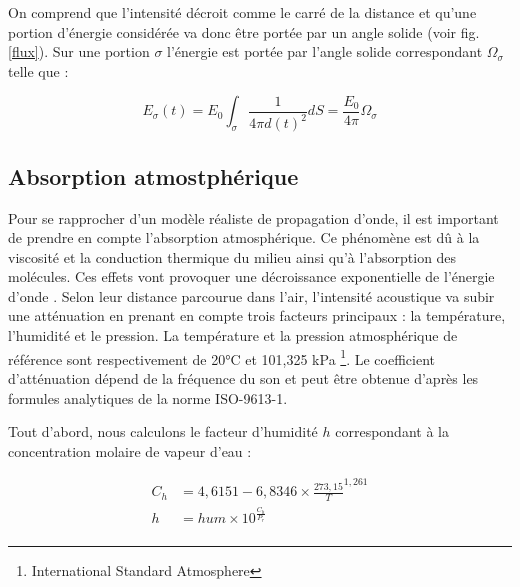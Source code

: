 On comprend que l'intensité décroit comme le carré de la distance et qu'une portion d'énergie considérée va donc être portée par un angle solide (voir fig. \ref{flux}). Sur une portion $\sigma$ l'énergie est portée par l'angle solide correspondant $\Omega_{\sigma}$ telle que :

\begin{equation} \label{eq_energie}
E_{\sigma}(t) = E_0 \int_{\sigma}  \frac{1}{4\pi  d(t)^2} dS = \frac{E_0}{4\pi}  \Omega_{\sigma}
\end{equation}





\subsection{Absorption atmostphérique}
 \label{sect_absAIr}
Pour se rapprocher d'un modèle réaliste de propagation d'onde, il est important de prendre en compte l'absorption atmosphérique. Ce phénomène est dû à la viscosité et la conduction thermique du milieu ainsi qu'à l'absorption des molécules. Ces effets vont provoquer une décroissance exponentielle de l'énergie d'onde \cite[p. 68-70]{jouhaneau}. Selon leur distance parcourue dans l'air, l'intensité acoustique va subir une atténuation en prenant en compte trois facteurs principaux : la température, l'humidité et le pression. La température et la pression atmosphérique de référence sont respectivement de 20°C et 101,325 kPa \footnote{International Standard Atmosphere}. Le coefficient d'atténuation dépend de la fréquence du son et peut être obtenue d'après les formules analytiques de la norme ISO-9613-1. 

Tout d'abord, nous calculons le facteur d'humidité $h$ correspondant à la concentration molaire de vapeur d'eau \cite[Annexe B, B.1]{iso} :

\begin{align}
	C_h & = 4,6151 - 6,8346 \times \frac{273,15}{T}^{1,261} \\
	h & = hum \times 10^{\frac{C_h}{P_r}} \\ 
\end{align}

